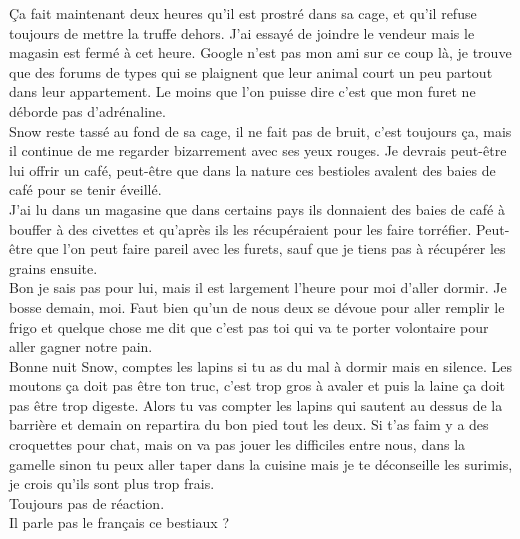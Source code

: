 Ça fait maintenant deux heures qu'il est prostré dans sa cage, et qu'il refuse toujours de mettre la truffe dehors. J'ai essayé de joindre le vendeur mais le magasin est fermé à cet heure. Google n'est pas mon ami sur ce coup là, je trouve que des forums de types qui se plaignent que leur animal court un peu partout dans leur appartement. Le moins que l'on puisse dire c'est que mon furet ne déborde pas d'adrénaline.\\
Snow reste tassé au fond de sa cage, il ne fait pas de bruit, c'est toujours ça, mais il continue de me regarder bizarrement avec ses yeux rouges. Je devrais peut-être lui offrir un café, peut-être que dans la nature ces bestioles avalent des baies de café pour se tenir éveillé.\\
J'ai lu dans un magasine que dans certains pays ils donnaient des baies de café à bouffer à des civettes et qu'après ils les récupéraient pour les faire torréfier. Peut-être que l'on peut faire pareil avec les furets, sauf que je tiens pas à récupérer les grains ensuite. \\

Bon je sais pas pour lui, mais il est largement l'heure pour moi d'aller dormir. Je bosse demain, moi. Faut bien qu'un de nous deux se dévoue pour aller remplir le frigo et quelque chose me dit que c'est pas toi qui va te porter volontaire pour aller gagner notre pain. \\
Bonne nuit Snow, comptes les lapins si tu as du mal à dormir mais en silence. Les moutons ça doit pas être ton truc, c'est trop gros à avaler et puis la laine ça doit pas être trop digeste. Alors tu vas compter les lapins qui sautent au dessus de la barrière et demain on repartira du bon pied tout les deux. Si t'as faim y a des croquettes pour chat, mais on va pas jouer les difficiles entre nous, dans la gamelle sinon tu peux aller taper dans la cuisine mais je te déconseille les surimis, je crois qu'ils sont plus trop frais. \\

Toujours pas de réaction. \\

Il parle pas le français ce bestiaux ? \\
